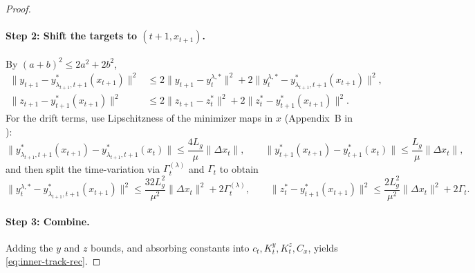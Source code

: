 \documentclass{uai2026} %
\begin{document}
\begin{proof}
\paragraph{Step 2: Shift the targets to $(t\!+\!1,x_{t+1})$.}
By $(a+b)^2\le 2a^2+2b^2$,
\begin{align*}
\|y_{t+1}-y^{*}_{\lambda_{t+1},t+1}(x_{t+1})\|^2
&\le 2\|y_{t+1}-y_t^{\lambda,*}\|^2+2\|y_t^{\lambda,*}-y^{*}_{\lambda_{t+1},t+1}(x_{t+1})\|^2,\\
\|z_{t+1}-y^{*}_{t+1}(x_{t+1})\|^2
&\le 2\|z_{t+1}-z_t^{*}\|^2+2\|z_t^{*}-y^{*}_{t+1}(x_{t+1})\|^2.
\end{align*}
For the drift terms, use Lipschitzness of the minimizer maps in $x$ (Appendix~B in \cite{ChenMaZhang2025}):
\[
\|y^{*}_{\lambda_{t+1},t+1}(x_{t+1})-y^{*}_{\lambda_{t+1},t+1}(x_t)\|\le \frac{4L_g}{\mu}\|\Delta x_t\|,
\qquad
\|y^{*}_{t+1}(x_{t+1})-y^{*}_{t+1}(x_t)\|\le \frac{L_g}{\mu}\|\Delta x_t\|,
\]
and then split the time-variation via $\Gamma_t^{(\lambda)}$ and $\Gamma_t$ to obtain
\[
\|y_t^{\lambda,*}-y^{*}_{\lambda_{t+1},t+1}(x_{t+1})\|^2\le \frac{32L_g^2}{\mu^2}\|\Delta x_t\|^2+2\Gamma_t^{(\lambda)},\qquad
\|z_t^{*}-y^{*}_{t+1}(x_{t+1})\|^2\le \frac{2L_g^2}{\mu^2}\|\Delta x_t\|^2+2\Gamma_t.
\]

\paragraph{Step 3: Combine.}
Adding the $y$ and $z$ bounds, and absorbing constants into $c_t,K_t^y,K_t^z,C_x$, yields \eqref{eq:inner-track-rec}.
\end{proof}
\end{document}
